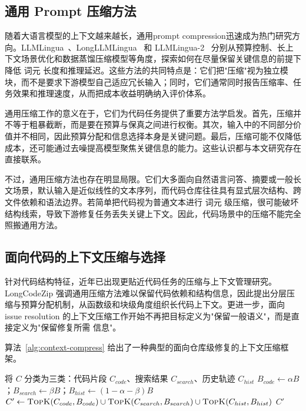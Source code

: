 \subsection{通用 Prompt 压缩方法}
随着大语言模型的上下文越来越长，通用prompt compression迅速成为热门研究方向。LLMLingua~\cite{jiang2023llmlingua}、LongLLMLingua~\cite{jiang2023longllmlingua} 和 LLMLingua-2~\cite{pan2024llmlingua2} 分别从预算控制、长上下文场景优化和数据蒸馏压缩模型等角度，探索如何在尽量保留关键信息的前提下降低 词元 长度和推理延迟。这些方法的共同特点是：它们把"压缩"视为独立模块，而不是要求下游模型自己适应冗长输入；同时，它们通常同时报告压缩率、任务效果和推理速度，从而把成本收益明确纳入评价体系。

通用压缩工作的意义在于，它们为代码任务提供了重要方法学启发。首先，压缩并不等于粗暴截断，而是要在预算与保真之间进行权衡。其次，输入中的不同部分价值并不相同，因此预算分配和信息选择本身是关键问题。最后，压缩可能不仅降低成本，还可能通过去噪提高模型聚焦关键信息的能力。这些认识都与本文研究存在直接联系。

不过，通用压缩方法也存在明显局限。它们大多面向自然语言问答、摘要或一般长文场景，默认输入是近似线性的文本序列，而代码仓库往往具有显式层次结构、跨文件依赖和语法边界。若简单把代码视为普通文本进行 词元 级压缩，很可能破坏结构线索，导致下游修复任务丢失关键上下文。因此，代码场景中的压缩不能完全照搬通用方法。

\subsection{面向代码的上下文压缩与选择}

针对代码结构特征，近年已出现更贴近代码任务的压缩与上下文管理研究。LongCodeZip 强调通用压缩方法难以保留代码依赖和结构信息，因此提出分层压缩与预算分配机制，从函数级和块级角度组织长代码上下文。更进一步，面向 issue resolution 的上下文压缩工作开始不再把目标定义为"保留一般语义"，而是直接定义为"保留修复所需 信息"。

算法~\ref{alg:context-compress} 给出了一种典型的面向仓库级修复的上下文压缩框架。

\begin{algorithm}[H]
\caption{面向仓库级修复的上下文压缩框架}
\label{alg:context-compress}
将 $C$ 分类为三类：代码片段 $C_{code}$、搜索结果 $C_{search}$、历史轨迹 $C_{hist}$\;
$B_{code} \leftarrow \alpha B$；\quad $B_{search} \leftarrow \beta B$；\quad $B_{hist} \leftarrow (1{-}\alpha{-}\beta) B$\;
$C' \leftarrow \textsc{TopK}(C_{code}, B_{code}) \cup \textsc{TopK}(C_{search}, B_{search}) \cup \textsc{TopK}(C_{hist}, B_{hist})$\;
\Return $C'$\;
\end{algorithm}

